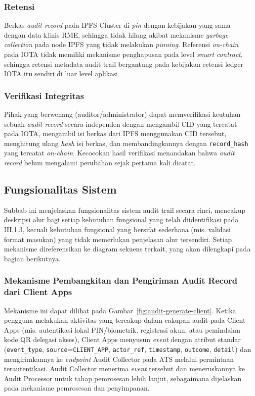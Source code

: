 \subsubsection{Retensi}
Berkas \textit{audit record} pada IPFS Cluster di-\textit{pin} dengan
kebijakan yang sama dengan data klinis RME, sehingga tidak hilang akibat
mekanisme \textit{garbage collection} pada node IPFS yang tidak melakukan
\textit{pinning}. Referensi \textit{on-chain} pada IOTA tidak memiliki
mekanisme penghapusan pada level \textit{smart contract}, sehingga retensi
metadata audit trail bergantung pada kebijakan retensi ledger IOTA itu
sendiri di luar level aplikasi.

\subsubsection{Verifikasi Integritas}
Pihak yang berwenang (auditor/administrator) dapat memverifikasi keutuhan
sebuah \textit{audit record} secara independen dengan mengambil CID yang
tercatat pada IOTA, mengambil isi berkas dari IPFS menggunakan CID tersebut,
menghitung ulang \textit{hash} isi berkas, dan membandingkannya dengan
\texttt{record\_hash} yang tercatat \textit{on-chain}. Kecocokan hasil
verifikasi menandakan bahwa \textit{audit record} belum mengalami perubahan
sejak pertama kali dicatat.

\subsection{Fungsionalitas Sistem}

Subbab ini menjelaskan fungsionalitas sistem audit trail secara rinci,
mencakup deskripsi alur bagi setiap kebutuhan fungsional yang telah
diidentifikasi pada III.1.3, kecuali kebutuhan fungsional yang bersifat
sederhana (mis. validasi format masukan) yang tidak memerlukan penjelasan
alur tersendiri. Setiap mekanisme direferensikan ke diagram sekuens terkait,
yang akan dilengkapi pada bagian berikutnya.

\subsubsection{Mekanisme Pembangkitan dan Pengiriman Audit Record dari Client Apps}
Mekanisme ini dapat dilihat pada Gambar~\ref{fig:audit-generate-client}.
Ketika pengguna melakukan aktivitas yang tercakup dalam cakupan audit pada
Client Apps (mis. autentikasi lokal PIN/biometrik, registrasi akun, atau
pemindaian kode QR delegasi akses), Client Apps menyusun \textit{event}
dengan atribut standar (\texttt{event\_type}, \texttt{source}=\texttt{CLIENT\_APP},
\texttt{actor\_ref}, \texttt{timestamp}, \texttt{outcome}, \texttt{detail}) dan
mengirimkannya ke \textit{endpoint} Audit Collector pada ATS melalui
permintaan terautentikasi. Audit Collector menerima \textit{event} tersebut
dan meneruskannya ke Audit Processor untuk tahap pemrosesan lebih lanjut,
sebagaimana dijelaskan pada mekanisme pemrosesan dan penyimpanan.

